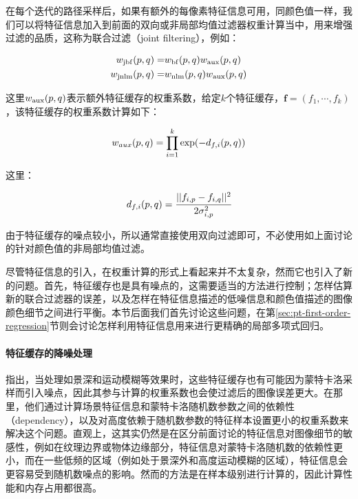 在每个迭代的路径采样后，如果有额外的每像素特征信息可用，同颜色值一样，我们可以将特征信息加入到前面的双向或非局部均值过滤器权重计算当中，用来增强过滤的品质，这称为联合过滤（joint filtering），例如：

\begin{equation}
	\begin{aligned}
		w_{\rm jbf}(p,q)=&w_{\rm bf}(p,q)w_{\rm aux}(p,q)\\
		w_{\rm jnlm}(p,q)=&w_{\rm nlm}(p,q)w_{\rm aux}(p,q)
	\end{aligned}
\end{equation}

\noindent 这里$w_{\rm aux}(p,q)$表示额外特征缓存的权重系数，给定$k$个特征缓存，$\mathbf{f}=(f_1,\cdots,f_k)$，该特征缓存的权重系数计算如下：

\begin{equation}
	w_{aux}(p,q)=\prod^{k}_{i=1}{\rm exp}(-d_{f,i}(p,q))
\end{equation}

\noindent 这里：

\begin{equation}\label{e:pt-feature-distance}
	d_{f,i}(p,q)= \cfrac{||f_{i,p}-f_{i,q}||^{2}}{2\sigma^{2}_{i,p}}
\end{equation}

\noindent 由于特征缓存的噪点较小，所以通常直接使用双向过滤即可，不必使用如上面讨论的针对颜色值的非局部均值过滤。

尽管特征信息的引入，在权重计算的形式上看起来并不太复杂，然而它也引入了新的问题。首先，特征缓存也是具有噪点的，这需要适当的方法进行控制；怎样估算新的联合过滤器的误差，以及怎样在特征信息描述的低噪信息和颜色值描述的图像颜色细节之间进行平衡。本节后面我们首先讨论这些问题，在第\ref{sec:pt-first-order-regression}节则会讨论怎样利用特征信息用来进行更精确的局部多项式回归。







\paragraph{特征缓存的降噪处理}
\cite{a:OnFilteringtheNoisefromtheRandomParametersinMonteCarloRendering}指出，当处理如景深和运动模糊等效果时，这些特征缓存也有可能因为蒙特卡洛采样而引入噪点，因此其参与计算的权重系数也会使过滤后的图像误差更大。在那里，他们通过计算场景特征信息和蒙特卡洛随机数参数之间的依赖性（dependency），以及对高度依赖于随机数参数的特征样本设置更小的权重系数来解决这个问题。直观上，这其实仍然是在区分前面讨论的特征信息对图像细节的敏感性，例如在纹理边界或物体边缘部分，特征信息对蒙特卡洛随机数的依赖性更小，而在一些低频的区域（例如处于景深外和高度运动模糊的区域），特征信息会更容易受到随机数噪点的影响。然而\cite{a:OnFilteringtheNoisefromtheRandomParametersinMonteCarloRendering}的方法是在样本级别进行计算的，因此计算性能和内存占用都很高。


